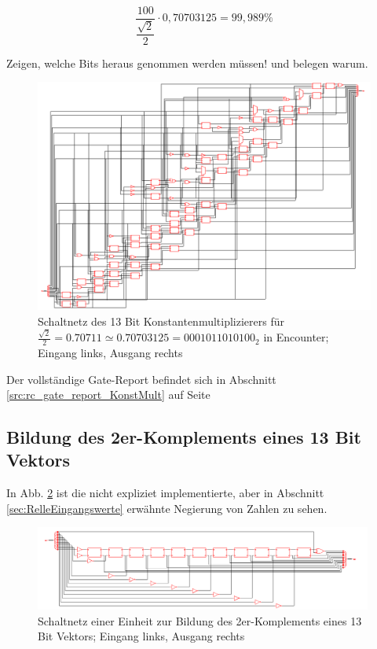 \begin{equation}\label{eq:abweichungWurzel2halbe}
 \frac{100}{\dfrac{\sqrt{2}}{2}}\cdot 0,70703125 = 99,989\%
\end{equation}

Zeigen, welche Bits heraus genommen werden müssen! und belegen warum.

\begin{figure}[!ht]
\centering  
  \includegraphics[width=1\textwidth]{img/13Bit_Konstantenmultiplizierer_neu.png}
  \caption{Schaltnetz des 13 Bit Konstantenmultiplizierers für $\frac{\sqrt{2}}{2} = 0.70711 \simeq 0.70703125 = 0001011010100_2$ in Encounter; Eingang links, Ausgang rechts}
  \label{pic:Konstantenmultiplizierer}
\end{figure}

Der vollständige Gate-Report befindet sich in Abschnitt \ref{src:rc_gate_report_KonstMult} auf Seite \pageref{src:rc_gate_report_KonstMult}



\subsection{Bildung des 2er-Komplements eines 13 Bit Vektors}


In Abb. \ref{pic:13BitInverter} ist die nicht expliziet implementierte, aber in Abschnitt \ref{sec:RelleEingangswerte} erwähnte Negierung von Zahlen zu sehen.

\begin{figure}[htpb]
\centering
\includegraphics[width=0.99\textwidth]{img/13Bit_Negierer.png}
\caption{Schaltnetz einer Einheit zur Bildung des 2er-Komplements eines 13 Bit Vektors; Eingang links, Ausgang rechts}
\label{pic:13BitInverter}
\end{figure}

